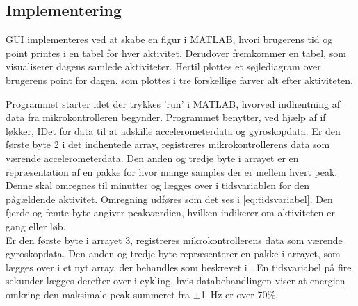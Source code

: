 \subsection{Implementering}
GUI implementeres ved at skabe en figur i MATLAB, hvori brugerens tid og point printes i en tabel for hver aktivitet. Derudover fremkommer en tabel, som visualiserer dagens samlede aktiviteter. Hertil plottes et søjlediagram over brugerens point for dagen, som plottes i tre forskellige farver alt efter aktiviteten. %

Programmet starter idet der trykkes 'run' i MATLAB, hvorved indhentning af data fra mikrokontrolleren begynder. Programmet benytter, ved hjælp af if løkker, IDet for data til at adskille accelerometerdata og gyroskopdata. Er den første byte 2 i det indhentede array, registreres mikrokontrollerens data som værende accelerometerdata. Den anden og tredje byte i arrayet er en repræsentation af en pakke for hvor mange samples der er mellem hvert peak. Denne skal omregnes til minutter og lægges over i tidsvariablen for den pågældende aktivitet. Omregning udføres som det ses i \eqref{eq:tidsvariabel}. Den fjerde og femte byte angiver peakværdien, hvilken indikerer om aktiviteten er gang eller løb. \\
Er den første byte i arrayet 3, registreres mikrokontrollerens data som værende gyroskopdata. Den anden og tredje byte repræsenterer en pakke i arrayet, som lægges over i et nyt array, der behandles som beskrevet i . En tidsvariabel på fire sekunder lægges derefter over i cykling, hvis databehandlingen viser at energien omkring den maksimale peak summeret fra $\pm$1~Hz er over 70\%.  
